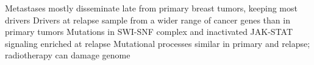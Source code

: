 Metastases mostly disseminate late from primary breast tumors, keeping most drivers
Drivers at relapse sample from a wider range of cancer genes than in primary tumors
Mutations in SWI-SNF complex and inactivated JAK-STAT signaling enriched at relapse
Mutational processes similar in primary and relapse; radiotherapy can damage genome
